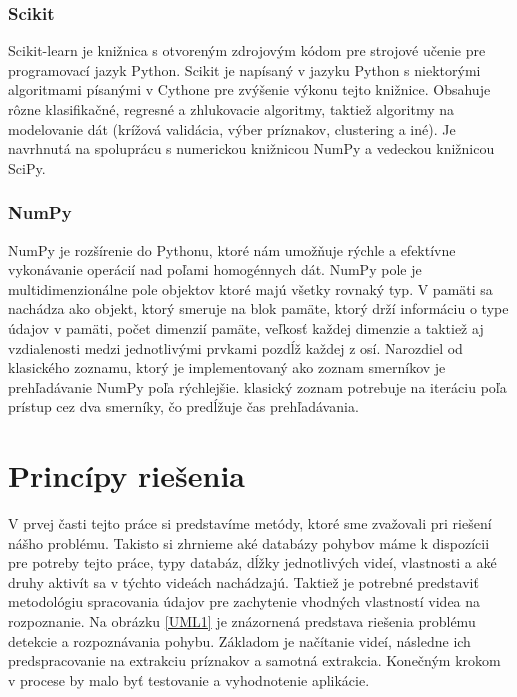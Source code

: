 \subsubsection{Scikit}
Scikit-learn je knižnica s otvoreným zdrojovým kódom pre strojové učenie pre programovací jazyk Python. Scikit je napísaný v jazyku Python s niektorými algoritmami písanými v Cythone pre zvýšenie výkonu tejto knižnice. Obsahuje rôzne klasifikačné, regresné a zhlukovacie algoritmy, taktiež algoritmy na modelovanie dát (krížová validácia, výber príznakov, clustering a iné). Je navrhnutá na spoluprácu s numerickou knižnicou NumPy a vedeckou knižnicou SciPy. \cite{c5}

\subsubsection{NumPy}
NumPy je rozšírenie do Pythonu, ktoré nám umožňuje rýchle a efektívne vykonávanie operácií nad poľami homogénnych dát. NumPy pole je multidimenzionálne pole objektov ktoré majú všetky rovnaký typ. V pamäti sa nachádza ako objekt, ktorý smeruje na blok pamäte, ktorý drží informáciu o type údajov v pamäti, počet dimenzií pamäte, veľkosť každej dimenzie a taktiež aj vzdialenosti medzi jednotlivými prvkami pozdĺž každej z osí. Narozdiel od klasického zoznamu, ktorý je implementovaný ako zoznam smerníkov je prehľadávanie NumPy poľa rýchlejšie. klasický zoznam potrebuje na iteráciu poľa prístup cez dva smerníky, čo predĺžuje čas prehľadávania.\cite{c8}


\section{Princípy riešenia}
V prvej časti tejto práce si predstavíme  metódy, ktoré sme zvažovali pri riešení nášho problému. Takisto si zhrnieme aké databázy pohybov máme k dispozícii pre potreby tejto práce, typy databáz, dĺžky jednotlivých videí, vlastnosti a aké druhy aktivít sa v týchto videách nachádzajú. Taktiež je potrebné predstaviť metodológiu spracovania údajov pre zachytenie vhodných vlastností videa na rozpoznanie. Na obrázku \ref{UML1} je znázornená predstava riešenia problému detekcie a rozpoznávania pohybu. Základom je načítanie videí, následne ich predspracovanie na extrakciu príznakov a samotná extrakcia. Konečným krokom v procese by malo byť testovanie a vyhodnotenie aplikácie. 


